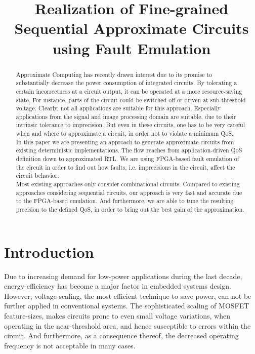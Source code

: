 \documentclass[conference]{IEEEtran}
\begin{document}
\title{Realization of Fine-grained Sequential Approximate Circuits using Fault Emulation}


\author{
\IEEEauthorblockA{}
\and
{}
\IEEEauthorblockA{}
}


\maketitle


\begin{abstract}
Approximate Computing has recently drawn interest due to its promise to substantially decrease the power consumption of integrated circuits. By tolerating a certain incorrectness at a circuit output, it can be operated at a more resource-saving state. For instance, parts of the circuit could be switched off or driven at sub-threshold voltage. Clearly, not all applications are suitable for this approach. Especially applications from the signal and image processing domain are suitable, due to their intrinsic tolerance to imprecision. But even in these circuits, one has to be very careful when and where to approximate a circuit, in order not to violate a minimum QoS.\\
In this paper we are presenting an approach to generate approximate circuits from existing deterministic implementations. The flow reaches from application-driven QoS definition down to approximated RTL. We are using FPGA-based fault emulation of the circuit in order to find out how faults, i.e. imprecisions in the circuit, affect the circuit behavior.\\
Most existing approaches only consider combinational circuits. Compared to existing approaches considering sequential circuits, our approach is very fast and accurate due to the FPGA-based emulation. And furthermore, we are able to tune the resulting precision to the defined QoS, in order to bring out the best gain of the approximation.
\end{abstract}

\IEEEpeerreviewmaketitle



\section{Introduction}
Due to increasing demand for low-power applications during the last decade, energy-efficiency has become a major factor in embedded systems design. However, voltage-scaling, the most efficient technique to save power, can not be further applied in conventional systems. The sophisticated scaling of MOSFET feature-sizes, makes circuits prone to even small voltage variations, when operating in the near-threshold area, and hence susceptible to errors within the circuit. And furthermore, as a consequence thereof, the decreased operating frequency is not acceptable in many cases.
\end{document}
